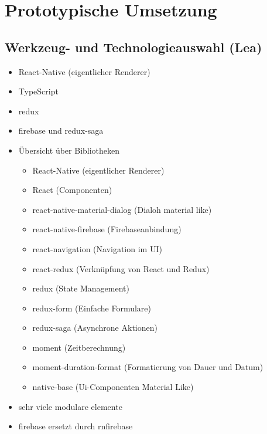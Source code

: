 \section{Prototypische Umsetzung}\label{sec:prototyp}

\subsection{Werkzeug- und Technologieauswahl (Lea)}
\begin{itemize}
    \item React-Native (eigentlicher Renderer)
    \item TypeScript
    \item redux 
    \item firebase und redux-saga
\end{itemize}

\begin{itemize}
    \item Übersicht über Bibliotheken
    \begin{itemize}
        \item React-Native (eigentlicher Renderer)
        \item React (Componenten)
        \item react-native-material-dialog (Dialoh material like)
        \item react-native-firebase (Firebaseanbindung)
        \item react-navigation (Navigation im UI)
        \item react-redux (Verknüpfung von React und Redux)
        \item redux (State Management)
        \item redux-form (Einfache Formulare)
        \item redux-saga (Asynchrone Aktionen)
        \item moment (Zeitberechnung)
        \item moment-duration-format (Formatierung von Dauer und Datum)
        \item native-base (Ui-Componenten Material Like)
    \end{itemize}
    \item sehr viele modulare elemente
    \item firebase ersetzt durch rnfirebase
\end{itemize}

